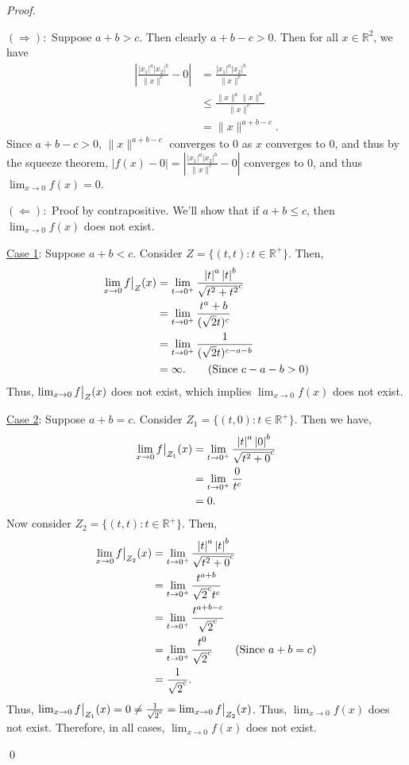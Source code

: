 \documentclass[12pt]{article}
\newenvironment{sol}
    {\emph{Proof.}
    }
    {
    \qed
    }
\newcommand\restr[2]{{%
  \left.\kern-\nulldelimiterspace %
  #1 %
  \vphantom{\big|} %
  \right|_{#2} %
  }}
\begin{document}
\begin{sol}
$(\Longrightarrow):$ Suppose $a + b > c$. Then clearly $a+b-c > 0$. Then for all $x \in \mathbb{R}^2$, we have \begin{align*}
\left|\frac{\left| x_1 \right|^a\left|x_2\right|^b}{\lVert x \rVert^c} - 0\right| &= \frac{\left| x_1 \right|^a\left|x_2\right|^b}{\lVert x \rVert^c} \\ &\leq \frac{\lVert x \rVert ^a \lVert x \rVert^b}{\lVert x \rVert^c} \tag*{(By the fundamental inequalities)} \\ &= \lVert x \rVert^{a + b - c}.
\end{align*} Since $a+b-c > 0$, $\lVert x \rVert^{a+b-c}$ converges to $0$ as $x$ converges to $0$, and thus by the squeeze theorem, $\left| f(x) - 0 \right| = \left|\frac{\left| x_1 \right|^a\left|x_2\right|^b}{\lVert x \rVert^c} - 0\right|$ converges to $0$, and thus $\lim_{x \to 0} f(x) = 0$.

$(\Longleftarrow):$ Proof by contrapositive. We'll show that if $a + b \leq c$, then $\lim_{x \to 0}f(x)$ does not exist. 

\underline{Case 1}: Suppose $a + b < c$. Consider $Z = \{(t, t) : t \in \mathbb{R}^+\}$. Then, \begin{align*}
\lim_{x \to 0}\restr{f}{Z}(x) &= \lim_{t \to 0^+} \frac{\left| t \right|^a \left| t \right|^b}{\sqrt{t^2 + t^2}^c} \\ &=\lim_{t \to 0^+} \frac{t^a+b}{(\sqrt{2}t)^c} \\ &= \lim_{t \to 0^+} \frac{1}{(\sqrt{2}t)^{c-a-b}} \\ &= \infty. \tag*{(Since $c - a - b > 0$)}
\end{align*}
Thus, $\lim_{x \to 0}\restr{f}{Z}(x)$ does not exist, which implies $\lim_{x \to 0}f(x)$ does not exist.

\underline{Case 2}: Suppose $a + b = c$. Consider $Z_1 = \{(t,0) : t \in \mathbb{R}^+\}$. Then we have, \begin{align*}
\lim_{x \to 0}\restr{f}{Z_1}(x) &= \lim_{t \to 0^+}\frac{\left| t \right|^a \left| 0 \right|^b}{\sqrt{t^2 + 0}^c} \\ &= \lim_{t \to 0^+}\frac{0}{t^c} \\ &= 0.
\end{align*}
Now consider $Z_2 = \{(t,t) : t \in \mathbb{R}^+\}$. Then, \begin{align*}
\lim_{x \to 0}\restr{f}{Z_2}(x) &= \lim_{t \to 0^+}\frac{\left| t \right|^a \left| t \right|^b}{\sqrt{t^2 + 0}^c} \\ &= \lim_{t \to 0^+}\frac{t^{a+b}}{\sqrt{2}^ct^c} \\ &= \lim_{t \to 0^+} \frac{t^{a+b-c}}{\sqrt{2}^c} \\ &= \lim_{t \to 0^+} \frac{t^0}{\sqrt{2}^c} \tag*{(Since $a+b=c$)} \\ &= \frac{1}{\sqrt{2}^c}.
\end{align*}
Thus, $\lim_{x \to 0}\restr{f}{Z_1}(x) = 0 \neq \frac{1}{\sqrt{2}^c} = \lim_{x \to 0}\restr{f}{Z_2}(x)$. Thus, $\lim_{x \to 0}f(x)$ does not exist. Therefore, in all cases, $\lim_{x \to 0}f(x)$ does not exist.
\end{sol}
\end{document}
